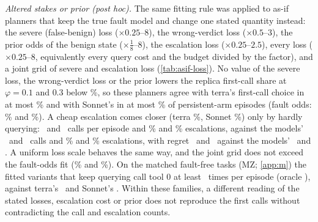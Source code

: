 \emph{Altered stakes or prior (post hoc).} The same fitting rule was applied to as-if planners that keep the true fault model and change one stated quantity instead: the severe (false-benign) loss ($\times0.25$--$8$), the wrong-verdict loss ($\times0.5$--$3$), the prior odds of the benign state ($\times\frac18$--$8$), the escalation loss ($\times0.25$--$2.5$), every loss ($\times0.25$--$8$, equivalently every query cost and the budget divided by the factor), and a joint grid of severe and escalation loss (\cref{tab:asif-loss}). No value of the severe loss, the wrong-verdict loss or the prior lowers the replica first-call share at $\varphi=0.1$ and $0.3$ below \zlMinFirstLow\%, so these planners agree with terra's first-call choice in at most \zlTerraStakeMax\% and with Sonnet's in at most \zlSonnetStakeMax\% of persistent-arm episodes (fault odds: \zTerraMatchFit\% and \zSonnetMatchFit\%). A cheap escalation comes closer (terra \zlTerraEscFit\%, Sonnet \zlSonnetEscFit\%) only by hardly querying: \zlTerraEscCalls\ and \zlSonnetEscCalls\ calls per episode and \zlTerraEscEsc\% and \zlSonnetEscEsc\% escalations, against the models' \zlTerraObsCalls\ and \zlSonnetObsCalls\ calls and \zlTerraObsEsc\% and \zlSonnetObsEsc\% escalations, with regret \zlTerraEscRegret\ and \zlSonnetEscRegret\ against the models' \zlTerraObsRegret\ and \zlSonnetObsRegret. A uniform loss scale behaves the same way, and the joint grid does not exceed the fault-odds fit (\zlTerraJointFit\% and \zlSonnetJointFit\%). On the matched fault-free tasks (MZ; \cref{app:m}) the fitted variants that keep querying call tool 0 at least \zlTerraMZRepMin\ times per episode (oracle \zlOracleMZRep), against terra's \zlTerraMZRepObs\ and Sonnet's \zlSonnetMZRepObs. Within these families, a different reading of the stated losses, escalation cost or prior does not reproduce the first calls without contradicting the call and escalation counts.

